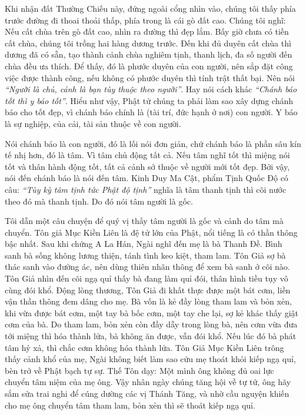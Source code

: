 \documentclass[
  12pt,
  oneside]{book}
\begin{document}
Khi nhận đất Thường Chiếu này, đứng ngoài cổng nhìn vào, chúng tôi thấy phía trước đường đi thoai thoải thấp, phía trong là cái gò đất cao. Chúng tôi nghĩ: Nếu cất chùa trên gò đất cao, nhìn ra đường thì đẹp lắm. Bấy giờ chưa có tiền cất chùa, chúng tôi trồng hai hàng dương trước. Đến khi đủ duyên cất chùa thì dương đã có sẵn, tạo thành cảnh chùa nghiêm tịnh, thanh lịch, đa số người đến chùa đều ưa thích. Để thấy, đó là phước duyên của con người, nên sắp đặt công việc được thành công, nếu không có phước duyên thì tính trật thất bại. Nên nói \emph{``Người là chủ, cảnh là bạn tùy thuộc theo người''}. Hay nói cách khác \emph{``Chánh báo tốt thì y báo tốt''}. Hiểu như vậy, Phật tử chúng ta phải làm sao xây dựng chánh báo cho tốt đẹp, vì chánh báo chính là (tài trí, đức hạnh ở nơi) con người. Y báo là sự nghiệp, của cải, tài sản thuộc về con người.

Nói chánh báo là con người, đó là lối nói đơn giản, chứ chánh báo là phần sâu kín tế nhị hơn, đó là tâm. Vì tâm chủ động tất cả. Nếu tâm nghĩ tốt thì miệng nói tốt và thân hành động tốt, tất cả cảnh sở thuộc về người mới tốt đẹp. Bởi vậy, nói đến chánh báo là nói đến tâm. Kinh Duy Ma Cật, phẩm Tịnh Quốc Độ có câu: \emph{``Tùy kỳ tâm tịnh tức Phật độ tịnh''} nghĩa là tâm thanh tịnh thì cõi nước theo đó mà thanh tịnh. Do đó nói tâm người là gốc.

Tôi dẫn một câu chuyện để quý vị thấy tâm người là gốc và cảnh do tâm mà chuyển. Tôn giả Mục Kiền Liên là đệ tử lớn của Phật, nổi tiếng là có thần thông bậc nhất. Sau khi chứng A La Hán, Ngài nghĩ đến mẹ là bà Thanh Đề. Bình sanh bà sống không lương thiện, tánh tình keo kiệt, tham lam. Tôn Giả sợ bà thác sanh vào đường ác, nên dùng thiên nhãn thông để xem bà sanh ở cõi nào. Tôn Giả nhìn đến cõi ngạ quỉ thấy bà đang làm quỉ đói, thân hình tiều tụy vô cùng đói khổ. Động lòng thương, Tôn Giả đi khất thực được một bát cơm, liền vận thần thông đem dâng cho mẹ. Bà vốn là kẻ đầy lòng tham lam và bỏn xẻn, khi vừa được bát cơm, một tay bà bốc cơm, một tay che lại, sợ kẻ khác thấy giật cơm của bà. Do tham lam, bỏn xẻn còn đầy dẫy trong lòng bà, nên cơm vừa đưa tới miệng thì hóa thành lửa, bà không ăn được, vẫn đói khổ. Nếu lúc đó bà phát tâm hỷ xả, thì chắc cơm không hóa thành lửa. Tôn Giả Mục Kiền Liên trông thấy cảnh khổ của mẹ, Ngài không biết làm sao cứu mẹ thoát khỏi kiếp ngạ quỉ, bèn trở về Phật bạch tự sự. Thế Tôn dạy: Một mình ông không đủ oai lực chuyển tâm niệm của mẹ ông. Vậy nhân ngày chúng tăng hội về tự tứ, ông hãy sắm sửa trai nghi để cúng dường các vị Thánh Tăng, và nhờ cầu nguyện khiến cho mẹ ông chuyển tâm tham lam, bỏn xẻn thì sẽ thoát kiếp ngạ quỉ.
\end{document}

